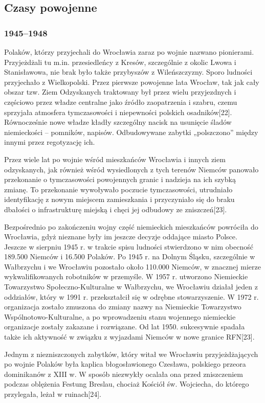\documentclass{article}
\begin{document}
\subsection{Czasy powojenne}
\subsubsection{1945–1948}
Polaków, którzy przyjechali do Wrocławia zaraz po wojnie nazwano pionierami. Przyjeżdżali tu m.in. przesiedleńcy z Kresów, szczególnie z okolic Lwowa i Stanisławowa, nie brak było także przybyszów z Wileńszczyzny. Sporo ludności przyjechało z Wielkopolski. Przez pierwsze powojenne lata Wrocław, tak jak cały obszar tzw. Ziem Odzyskanych traktowany był przez wielu przyjezdnych i częściowo przez władze centralne jako źródło zaopatrzenia i szabru, czemu sprzyjała atmosfera tymczasowości i niepewności polskich osadników[22]. Równocześnie nowe władze kładły szczególny nacisk na usunięcie śladów niemieckości – pomników, napisów. Odbudowywane zabytki „polszczono” między innymi przez regotyzację ich.

Przez wiele lat po wojnie wśród mieszkańców Wrocławia i innych ziem odzyskanych, jak również wśród wysiedlonych z tych terenów Niemców panowało przekonanie o tymczasowości powojennych granic i nadzieja na ich szybką zmianę. To przekonanie wywoływało poczucie tymczasowości, utrudniało identyfikację z nowym miejscem zamieszkania i przyczyniało się do braku dbałości o infrastrukturę miejską i chęci jej odbudowy ze zniszczeń[23].

Bezpośrednio po zakończeniu wojny część niemieckich mieszkańców powróciła do Wrocławia, gdyż nieznane były im jeszcze decyzje oddające miasto Polsce. Jeszcze w sierpniu 1945 r. w trakcie spisu ludności stwierdzono w nim obecność 189.500 Niemców i 16.500 Polaków. Po 1945 r. na Dolnym Śląsku, szczególnie w Wałbrzychu i we Wrocławiu pozostało około 110.000 Niemców, w znacznej mierze wykwalifikowanych robotników w przemyśle. W 1957 r. utworzono Niemieckie Towarzystwo Społeczno-Kulturalne w Wałbrzychu, we Wrocławiu działał jeden z oddziałów, który w 1991 r. przekształcił się w odrębne stowarzyszenie. W 1972 r. organizacja zostało zmuszona do zmiany nazwy na Niemieckie Towarzystwo Wspólnotowo-Kulturalne, a po wprowadzeniu stanu wojennego niemieckie organizacje zostały zakazane i rozwiązane. Od lat 1950. sukcesywnie spadała także ich aktywność w związku z wyjazdami Niemców w nowe granice RFN[23].

Jednym z niezniszczonych zabytków, który witał we Wrocławiu przyjeżdżających po wojnie Polaków była kaplica błogosławionego Czesława, polskiego przeora dominikanów z XIII w. W sposób niezwykły ocalała ona przed zniszczeniem podczas oblężenia Festung Breslau, chociaż Kościół św. Wojciecha, do którego przylegała, leżał w ruinach[24].
\end{document}
